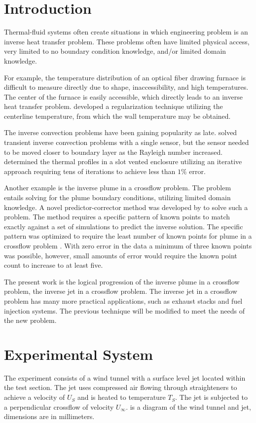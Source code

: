 \documentclass[preprint,12pt]{elsarticle}
\begin{document}
\section{Introduction}
Thermal-fluid systems often create situations in which engineering problem is an inverse heat transfer problem.  These problems often have limited physical access, very limited to no boundary condition knowledge, and/or limited domain knowledge.

For example, the temperature distribution of an optical fiber drawing furnace is difficult to measure directly due to shape, inaccessibility, and high temperatures.  The center of the furnace is easily accessible, which directly leads to an inverse heat transfer problem.   developed a regularization technique utilizing the centerline temperature, from which the wall temperature may be obtained.

The inverse convection problems have been gaining popularity as late.   solved transient inverse convection problems with a single sensor, but the sensor needed to be moved closer to boundary layer as the Rayleigh number increased.   determined the thermal profiles in a slot vented enclosure utilizing an iterative approach requiring tens of iterations to achieve less than $1\%$ error.

Another example is the inverse plume in a crossflow problem.  The problem entails solving for the plume boundary conditions, utilizing limited domain knowledge.  A novel predictor-corrector method was developed by \citet{ijhmt1} to solve such a problem.  The method requires a specific pattern of known points to match exactly against a set of simulations to predict the inverse solution.  The specific pattern was optimized to require the least number of known points for plume in a crossflow problem \cite{ijhmt2}.  With zero error in the data a minimum of three known points was possible, however, small amounts of error would require the known point count to increase to at least five.

The present work is the logical progression of the inverse plume in a crossflow problem, the inverse jet in a crossflow problem.  The inverse jet in a crossflow problem has many more practical applications, such as exhaust stacks and fuel injection systems.  The previous technique will be modified to meet the needs of the new problem.


\section{Experimental System}
The experiment consists of a wind tunnel with a surface level jet located within the test section.  The jet uses compressed air flowing through straighteners to achieve a velocity of $U_S$ and is heated to temperature $T_S$.  The jet is subjected to a perpendicular crossflow of velocity $U_{\infty}$.   is a diagram of the wind tunnel and jet, dimensions are in millimeters.
\end{document}

